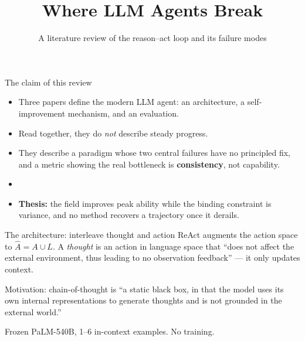 \documentclass[aspectratio=169]{beamer}
\title{Where LLM Agents Break}
\subtitle{A literature review of the reason--act loop and its failure modes}
\author{}
\date{}
\begin{document}
\begin{frame}[plain]
  \titlepage
\end{frame}

\begin{frame}{The claim of this review}
  \begin{itemize}
    \item Three papers define the modern LLM agent: an architecture, a
      self-improvement mechanism, and an evaluation.
    \item Read together, they do \emph{not} describe steady progress.
    \item They describe a paradigm whose two central failures have no
      principled fix, and a metric showing the real bottleneck is
      \textbf{consistency}, not capability.
    \item[]
    \item \textbf{Thesis:} the field improves peak ability while the binding
      constraint is variance, and no method recovers a trajectory once it
      derails.
  \end{itemize}
\end{frame}

\begin{frame}{The architecture: interleave thought and action}
  ReAct \citep{yao2023reactsynergizingreasoningacting} augments the action space
  to $\hat{A} = A \cup L$. A \emph{thought} is an action in language space that
  ``does not affect the external environment, thus leading to no observation
  feedback'' --- it only updates context.

  \vspace{1em}
  Motivation: chain-of-thought is ``a static black box, in that the model uses
  its own internal representations to generate thoughts and is not grounded in
  the external world.''

  \vspace{1em}
  Frozen PaLM-540B, 1--6 in-context examples. No training.
\end{frame}
\end{document}
